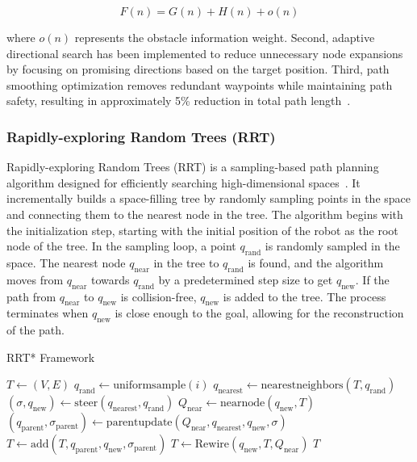 \begin{equation}
    F(n) = G(n) + H(n) + o(n)
\end{equation}

\noindent where \(o(n)\) represents the obstacle information weight. Second, adaptive directional search has been implemented to reduce unnecessary node expansions by focusing on promising directions based on the target position. Third, path smoothing optimization removes redundant waypoints while maintaining path safety, resulting in approximately 5\% reduction in total path length~\cite{xiang2022combined}.

\newpage

\subsubsection{Rapidly-exploring Random Trees (RRT)}
Rapidly-exploring Random Trees (RRT) is a sampling-based path planning algorithm designed for efficiently searching high-dimensional spaces~\cite{ganesan2024hybrid}. It incrementally builds a space-filling tree by randomly sampling points in the space and connecting them to the nearest node in the tree. The algorithm begins with the initialization step, starting with the initial position of the robot as the root node of the tree. In the sampling loop, a point \(q_{\text{rand}}\) is randomly sampled in the space. The nearest node \(q_{\text{near}}\) in the tree to \(q_{\text{rand}}\) is found, and the algorithm moves from \(q_{\text{near}}\) towards \(q_{\text{rand}}\) by a predetermined step size to get \(q_{\text{new}}\). If the path from \(q_{\text{near}}\) to \(q_{\text{new}}\) is collision-free, \(q_{\text{new}}\) is added to the tree. The process terminates when \(q_{\text{new}}\) is close enough to the goal, allowing for the reconstruction of the path.

\vspace{-0.02cm}

\begin{algorithm}[H]
    \caption{RRT* Framework}\label{alg:rrt}
    \begin{algorithmic}[1]
    \STATE $T \leftarrow (V, E)$
        \STATE $q_{\text{rand}} \leftarrow \text{uniformsample}(i)$
        \STATE $q_{\text{nearest}} \leftarrow \text{nearestneighbors}(T,q_{\text{rand}})$
        \STATE $(\sigma, q_{\text{new}}) \leftarrow \text{steer}(q_{\text{nearest}},q_{\text{rand}})$
            \STATE $Q_{\text{near}} \leftarrow \text{nearnode}(q_{\text{new}},T)$
            \STATE $(q_{\text{parent}},\sigma_{\text{parent}}) \leftarrow \text{parentupdate}(Q_{\text{near}},q_{\text{nearest}},q_{\text{new}},\sigma)$
            \STATE $T \leftarrow \text{add}(T,q_{\text{parent}},q_{\text{new}},\sigma_{\text{parent}})$
            \STATE $T \leftarrow \text{Rewire}(q_{\text{new}},T,Q_{\text{near}})$
        \ENDIF
    \ENDFOR
    \RETURN $T$
    \end{algorithmic}
\end{algorithm}

